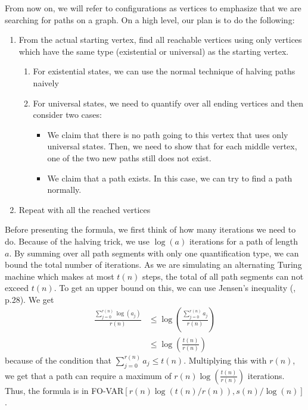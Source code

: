 From now on, we will refer to configurations as vertices to emphasize that we are searching for paths on a graph.
On a high level, our plan is to do the following:
\begin{enumerate}
    \setlength\itemsep{0.2em}
    \item From the actual starting vertex, find all reachable vertices using only vertices which have the same type (existential or universal) as the starting vertex.
    \begin{enumerate}
        \item For existential states, we can use the normal technique of halving paths naively
        \item For universal states, we need to quantify over all ending vertices and then consider two cases:
        \begin{itemize}
            \item We claim that there is no path going to this vertex that uses only universal states.
            Then, we need to show that for each middle vertex, one of the two new paths still does not exist.
            \item We claim that a path exists.
            In this case, we can try to find a path normally.
        \end{itemize}
    \end{enumerate}
    \item Repeat with all the reached vertices
\end{enumerate}

Before presenting the formula, we first think of how many iterations we need to do.
Because of the halving trick, we use $\log(a)$ iterations for a path of length $a$.
By summing over all path segments with only one quantification type, we can bound the total number of iterations.
As we are simulating an alternating Turing machine which makes at most $t(n)$ steps, the total of all path segments can not exceed $t(n)$.
To get an upper bound on this, we can use Jensen's inequality (\cite{inequalities-math-oly}, p.28).
We get
\[
    \begin{aligned}
        \frac{\sum_{j = 0}^{r(n)}\log(a_{j})}{r(n)} &\leq \log\left(\frac{\sum_{j= 0}^{r(n)}a_{j}}{r(n)} \right)  \\
        &\leq \log\left(\frac{t(n)}{r(n)} \right)
    \end{aligned}
\]
because of the condition that $\sum_{j= 0}^{r(n)}a_{j} \leq t(n)$.
Multiplying this with $r(n)$, we get that a path can require a maximum of $r(n)\log\left(\frac{t(n)}{r(n)} \right)$ iterations.
Thus, the formula is in {FO-VAR$\left[r(n)\log\left(t(n)/r(n) \right), s(n)/\log(n) \right]$}.


